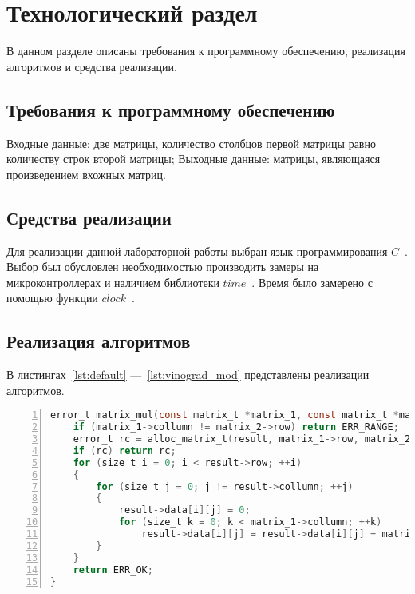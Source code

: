 \chapter{Технологический раздел}

В данном разделе описаны требования к программному обеспечению, реализация алгоритмов и средства реализации.

\section{Требования к программному обеспечению}

Входные данные: две матрицы, количество столбцов первой матрицы равно количеству строк второй матрицы;
Выходные данные: матрицы, являющаяся произведением вхожных матриц.


\section{Средства реализации}
Для реализации данной лабораторной работы выбран язык программирования $C$~\cite{C}. Выбор был обусловлен необходимостью производить замеры на микроконтроллерах и наличием библиотеки $time$~\cite{C_date}. Время было замерено с помощью функции $clock$~\cite{C_clock}.

\section{Реализация алгоритмов}
В листингах~\ref{lst:default} ---~\ref{lst:vinograd_mod} представлены реализации алгоритмов.

\begin{center}
\captionsetup{justification=raggedright,singlelinecheck=off}
\begin{lstlisting}[language=C, frame=single, numbers=left, label=lst:default, caption=Реализация классического алгоритма]
error_t matrix_mul(const matrix_t *matrix_1, const matrix_t *matrix_2, matrix_t *result) {
    if (matrix_1->collumn != matrix_2->row) return ERR_RANGE;
    error_t rc = alloc_matrix_t(result, matrix_1->row, matrix_2->collumn);
    if (rc) return rc;
    for (size_t i = 0; i < result->row; ++i)
    {
        for (size_t j = 0; j != result->collumn; ++j)
        {
            result->data[i][j] = 0;
            for (size_t k = 0; k < matrix_1->collumn; ++k)
                result->data[i][j] = result->data[i][j] + matrix_1->data[i][k] * matrix_2->data[k][j];
        }
    }
    return ERR_OK;
}\end{lstlisting}
\end{center}

